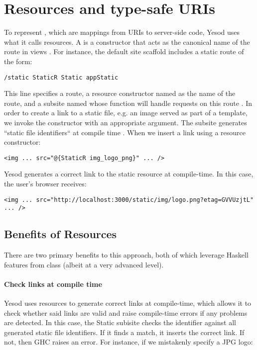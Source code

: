 \section{Resources and type-safe URIs} \label{resourcesAndTSURIs}

To represent , which are mappings from URIs to server-side code, Yesod uses what it calls resources. A  is a  constructor that acts as the canonical name of the route in views \cite{ybk}. For instance, the default site scaffold includes a static route of the form:

\begin{Verbatim}
/static StaticR Static appStatic
\end{Verbatim}

This line specifies a  route, a resource constructor named  as the name of the route, and a subsite named  whose function  will handle requests on this route \cite{ybkRouting}. In order to create a link to a static file, e.g. an image served as part of a template, we invoke the  constructor with an appropriate argument. The  subsite generates ``static file identifiers`` at compile time \cite{ybkScaffolding}. When we insert a link using a resource constructor:

\begin{Verbatim}
<img ... src="@{StaticR img_logo_png}" ... />
\end{Verbatim}

Yesod generates a correct link to the static resource at compile-time. In this case, the user's browser receives:

\begin{Verbatim}
<img ... src="http://localhost:3000/static/img/logo.png?etag=GVVUzjtL" ... />
\end{Verbatim}

\subsection{Benefits of Resources}

There are two primary benefits to this approach, both of which leverage Haskell features from class (albeit at a very advanced level).

\paragraph{Check links at compile time} Yesod uses resources to generate correct links at compile-time, which allows it to check whether said links are valid and raise compile-time errors if any problems are detected. In this case, the Static subisite checks the identifier  against all generated static file identifiers. If it finds a match, it inserts the correct link. If not, then GHC raises an error. For instance, if we mistakenly specify a JPG logo:

